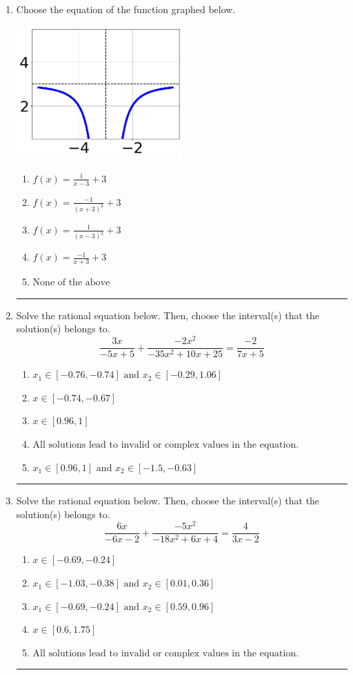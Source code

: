 \documentclass[14pt]{extbook}
\newcommand{\litem}[1]{\item#1\hspace*{-1cm}\rule{\textwidth}{0.4pt}}
\begin{document}
\begin{enumerate}
{\begin{enumerate}[label=\Alph*.]
\end{enumerate} }
\litem{
Choose the equation of the function graphed below.
\begin{center}
    \includegraphics[width=0.5\textwidth]{../Figures/rationalGraphToEquationCopyC.png}
\end{center}
\begin{enumerate}[label=\Alph*.]
\item \( f(x) = \frac{1}{x - 3} + 3 \)
\item \( f(x) = \frac{-1}{(x + 3)^2} + 3 \)
\item \( f(x) = \frac{1}{(x - 3)^2} + 3 \)
\item \( f(x) = \frac{-1}{x + 3} + 3 \)
\item \( \text{None of the above} \)

\end{enumerate} }
\litem{
Solve the rational equation below. Then, choose the interval(s) that the solution(s) belongs to.\[ \frac{3x}{-5x + 5} + \frac{-2x^{2}}{-35x^{2} +10 x + 25} = \frac{-2}{7x + 5} \]\begin{enumerate}[label=\Alph*.]
\item \( x_1 \in [-0.76, -0.74] \text{ and } x_2 \in [-0.29,1.06] \)
\item \( x \in [-0.74,-0.67] \)
\item \( x \in [0.96,1] \)
\item \( \text{All solutions lead to invalid or complex values in the equation.} \)
\item \( x_1 \in [0.96, 1] \text{ and } x_2 \in [-1.5,-0.63] \)

\end{enumerate} }
\litem{
Solve the rational equation below. Then, choose the interval(s) that the solution(s) belongs to.\[ \frac{6x}{-6x -2} + \frac{-5x^{2}}{-18x^{2} +6 x + 4} = \frac{4}{3x -2} \]\begin{enumerate}[label=\Alph*.]
\item \( x \in [-0.69,-0.24] \)
\item \( x_1 \in [-1.03, -0.38] \text{ and } x_2 \in [0.01,0.36] \)
\item \( x_1 \in [-0.69, -0.24] \text{ and } x_2 \in [0.59,0.96] \)
\item \( x \in [0.6,1.75] \)
\item \( \text{All solutions lead to invalid or complex values in the equation.} \)

\end{enumerate} }
\end{enumerate}
\end{document}
